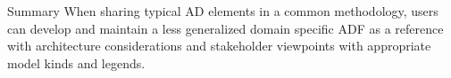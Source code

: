 \documentclass[10pt,letterpaper]{article}
\begin{document}
\begin{CornellSummaryBox}{Summary}
When sharing typical AD elements in a common methodology, users can develop and maintain a less generalized domain specific ADF as a reference with architecture considerations and stakeholder viewpoints with appropriate model kinds and legends.
\end{CornellSummaryBox}
\end{document}
